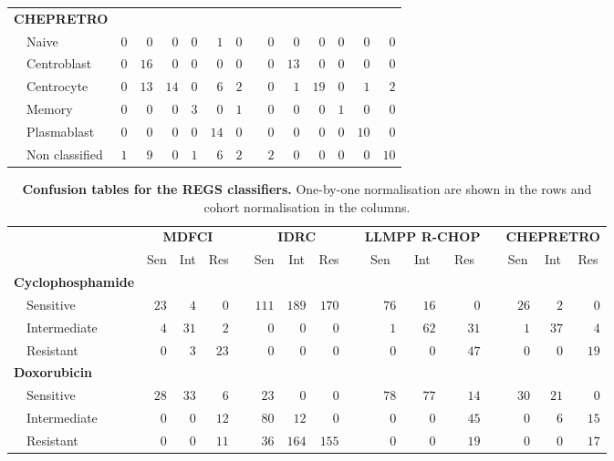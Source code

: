 \documentclass[10pt]{bmc_article}
\newenvironment{bmcformat}{\fussy\setboolean{publ}{true}}{\fussy}
\begin{document}
\begin{bmcformat}
\begin{table}[!tbp]
\begin{center}
\begin{tabular}{lrrrrrrcrrrrrr}
\hline
{\bfseries CHEPRETRO}&&&&&&&&&&&&&\tabularnewline
~~Naive&$0$&$ 0$&$  0$&$0$&$ 1$&$0$&&$0$&$ 0$&$  0$&$ 0$&$ 0$&$ 0$\tabularnewline
~~Centroblast&$0$&$16$&$  0$&$0$&$ 0$&$0$&&$0$&$13$&$  0$&$ 0$&$ 0$&$ 0$\tabularnewline
~~Centrocyte&$0$&$13$&$ 14$&$0$&$ 6$&$2$&&$0$&$ 1$&$ 19$&$ 0$&$ 1$&$ 2$\tabularnewline
~~Memory&$0$&$ 0$&$  0$&$3$&$ 0$&$1$&&$0$&$ 0$&$  0$&$ 1$&$ 0$&$ 0$\tabularnewline
~~Plasmablast&$0$&$ 0$&$  0$&$0$&$14$&$0$&&$0$&$ 0$&$  0$&$ 0$&$10$&$ 0$\tabularnewline
~~Non classified&$1$&$ 9$&$  0$&$1$&$ 6$&$2$&&$2$&$ 0$&$  0$&$ 0$&$ 0$&$10$\tabularnewline
\hline
\end{tabular}
\end{center}
\end{table}


\begin{table}[!tbp]
\small
\caption{\textbf{Confusion tables for the REGS classifiers.} One-by-one normalisation are shown in the rows and cohort normalisation in the columns.\label{tab:confusiondrugonebyone}}
\begin{center}
\begin{tabular}{lrrrcrrrcrrrcrrr}
\toprule
\multicolumn{1}{l}{\bfseries  }&\multicolumn{3}{c}{\bfseries MDFCI}&\multicolumn{1}{c}{\bfseries }&\multicolumn{3}{c}{\bfseries IDRC}&\multicolumn{1}{c}{\bfseries }&\multicolumn{3}{c}{\bfseries LLMPP R-CHOP}&\multicolumn{1}{c}{\bfseries }&\multicolumn{3}{c}{\bfseries CHEPRETRO}\tabularnewline
\cline{2-4} \cline{6-8} \cline{10-12} \cline{14-16}
\multicolumn{1}{l}{}&\multicolumn{1}{c}{Sen}&\multicolumn{1}{c}{Int}&\multicolumn{1}{c}{Res}&\multicolumn{1}{c}{}&\multicolumn{1}{c}{Sen}&\multicolumn{1}{c}{Int}&\multicolumn{1}{c}{Res}&\multicolumn{1}{c}{}&\multicolumn{1}{c}{Sen}&\multicolumn{1}{c}{Int}&\multicolumn{1}{c}{Res}&\multicolumn{1}{c}{}&\multicolumn{1}{c}{Sen}&\multicolumn{1}{c}{Int}&\multicolumn{1}{c}{Res}\tabularnewline
\hline
{\bfseries Cyclophosphamide}&&&&&&&&&&&&&&&\tabularnewline
~~Sensitive&$23$&$ 4$&$ 0$&&$111$&$189$&$170$&&$76$&$16$&$ 0$&&$26$&$ 2$&$ 0$\tabularnewline
~~Intermediate&$ 4$&$31$&$ 2$&&$  0$&$  0$&$  0$&&$ 1$&$62$&$31$&&$ 1$&$37$&$ 4$\tabularnewline
~~Resistant&$ 0$&$ 3$&$23$&&$  0$&$  0$&$  0$&&$ 0$&$ 0$&$47$&&$ 0$&$ 0$&$19$\tabularnewline
\hline
{\bfseries Doxorubicin}&&&&&&&&&&&&&&&\tabularnewline
~~Sensitive&$28$&$33$&$ 6$&&$ 23$&$  0$&$  0$&&$78$&$77$&$14$&&$30$&$21$&$ 0$\tabularnewline
~~Intermediate&$ 0$&$ 0$&$12$&&$ 80$&$ 12$&$  0$&&$ 0$&$ 0$&$45$&&$ 0$&$ 6$&$15$\tabularnewline
~~Resistant&$ 0$&$ 0$&$11$&&$ 36$&$164$&$155$&&$ 0$&$ 0$&$19$&&$ 0$&$ 0$&$17$\tabularnewline
\hline

\end{tabular}
\end{center}
\end{table}
\end{bmcformat}
\end{document}
